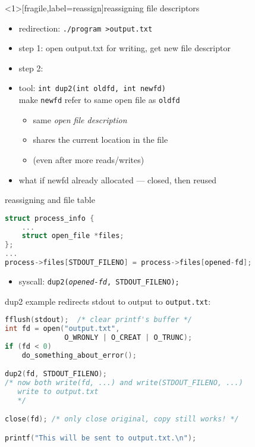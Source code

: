 \begin{frame}<1>[fragile,label=reassign]{reassigning file descriptors}
\begin{itemize}
\item redirection: \verb|./program >output.txt|
\item step 1: open output.txt for writing, get new file descriptor
\item step 2: 
\vspace{.5cm}
\item<2-> tool: \texttt{int dup2(int oldfd, int newfd)} \\
        make \texttt{newfd} refer to same open file as \texttt{oldfd}
    \begin{itemize}
    \item same \textit{open file description}
    \item shares the current location in the file
    \item (even after more reads/writes)
    \end{itemize}
\item<2-> what if newfd already allocated --- closed, then reused
\end{itemize}
\end{frame}

\begin{frame}[fragile,label=dup2AndTable]{reassigning and file table}
\begin{lstlisting}[language=C,style=smaller]
struct process_info {
    ...
    struct open_file *files;
};
...
process->files[STDOUT_FILENO] = process->files[opened-fd];
\end{lstlisting}
\begin{itemize}
\item syscall: \texttt{dup2(\textit{opened-fd}, STDOUT\_FILENO);}
\end{itemize}
\end{frame}


\begin{frame}[fragile,label=dup2example]{dup2 example}
redirects stdout to output to \texttt{output.txt}:
\begin{lstlisting}[language=C++,style=small]
fflush(stdout);  /* clear printf's buffer */
int fd = open("output.txt",
              O_WRONLY | O_CREAT | O_TRUNC);
if (fd < 0)
    do_something_about_error();

dup2(fd, STDOUT_FILENO);
/* now both write(fd, ...) and write(STDOUT_FILENO, ...) 
   write to output.txt
   */

close(fd); /* only close original, copy still works! */

printf("This will be sent to output.txt.\n");
\end{lstlisting}
\end{frame}
